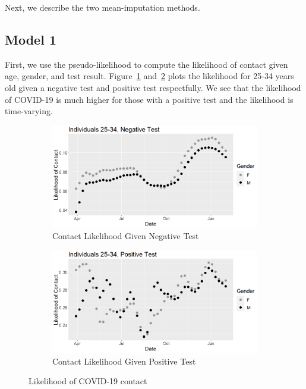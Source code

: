 \documentclass[11pt]{amsart}
\numberwithin{equation}{section}
\theoremstyle{plain}
\begin{document}
Next, we describe the two mean-imputation methods.
\subsection{Model 1}

First, we use the pseudo-likelihood to compute the likelihood of contact given age, gender, and test result.  Figure~\ref{fig:contactlik1} and~\ref{fig:contactlik2} plots the likelihood for 25-34 years old given a negative test and positive test respectfully.  We see that the likelihood of COVID-19 is much higher for those with a positive test and the likelihood is time-varying.

\begin{figure}[!th]
\centering
\begin{subfigure}{.5\textwidth}
 \centering
 \includegraphics[width=.9\linewidth]{../figs/tvprop_contact_fig1.png}
 \caption{Contact Likelihood Given Negative Test}
 \label{fig:contactlik1}
\end{subfigure}%
\begin{subfigure}{.5\textwidth}
 \centering
\includegraphics[width=.9\linewidth]{../figs/tvprop_contact_fig2.png}
 \caption{Contact Likelihood Given Positive Test}
 \label{fig:contactlik2}
\end{subfigure}
\caption{Likelihood of COVID-19 contact}
\label{fig:contactlik}
\end{figure}
\end{document}
